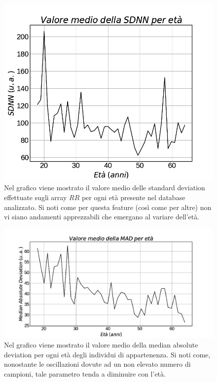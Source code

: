 \documentclass[12pt,a4paper, twoside, openright]{report}
\begin{document}
\begin{figure}[h!]
	\centering
	\includegraphics[width=\textwidth]{SDNN-age.jpg}
	\caption{Nel grafico viene mostrato il valore medio delle standard deviation 				effettuate sugli array $RR$ per ogni età presente nel database analizzato.
	Si noti come per questa feature (così come per altre) non vi siano andamenti 				apprezzabili che emergano al variare dell'età.}
	\label{fig:SDNN-age}
\end{figure}

\begin{figure}[h!]
	\centering
	\includegraphics[width=\textwidth]{MAD-age.jpg}
	\caption{Nel grafico viene mostrato il valore medio della median absolute deviation 	per ogni età degli individui di appartenenza.
	Si noti come, nonostante le oscillazioni dovute ad un non elevato numero di 				campioni, tale parametro tenda a diminuire con l'età.}
	\label{fig:MAD-age}
\end{figure}
\end{document}
